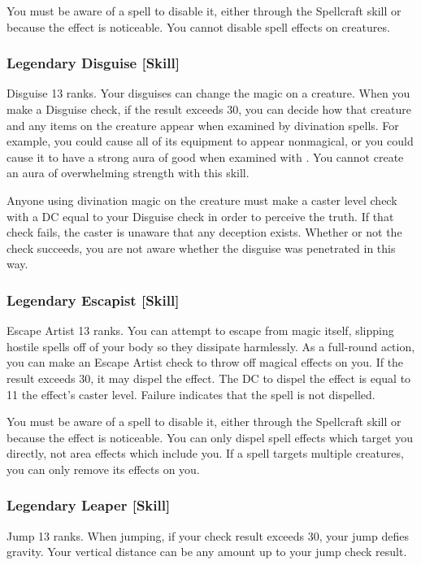 You must be aware of a spell to disable it, either through the Spellcraft skill or because the effect is noticeable. You cannot disable spell effects on creatures.

\subsubsection{Legendary Disguise [Skill]}
\featpre Disguise 13 ranks.
\featben Your disguises can change the magic on a creature. When you make a Disguise check, if the result exceeds 30, you can decide how that creature and any items on the creature appear when examined by divination spells. For example, you could cause all of its equipment to appear nonmagical, or you could cause it to have a strong aura of good when examined with . You cannot create an aura of overwhelming strength with this skill.

Anyone using divination magic on the creature must make a caster level check with a DC equal to your Disguise check in order to perceive the truth. If that check fails, the caster is unaware that any deception exists. Whether or not the check succeeds, you are not aware whether the disguise was penetrated in this way.

\subsubsection{Legendary Escapist [Skill]}
\featpre Escape Artist 13 ranks.
\featben You can attempt to escape from magic itself, slipping hostile spells off of your body so they dissipate harmlessly. As a full-round action, you can make an Escape Artist check to throw off magical effects on you. If the result exceeds 30, it may dispel the effect. The DC to dispel the effect is equal to 11 \add the effect's caster level. Failure indicates that the spell is not dispelled.

You must be aware of a spell to disable it, either through the Spellcraft skill or because the effect is noticeable. You can only dispel spell effects which target you directly, not area effects which include you. If a spell targets multiple creatures, you can only remove its effects on you.

\subsubsection{Legendary Leaper [Skill]}
\featpre Jump 13 ranks.
\featben When jumping, if your check result exceeds 30, your jump defies gravity. Your vertical distance can be any amount up to your jump check result. 

